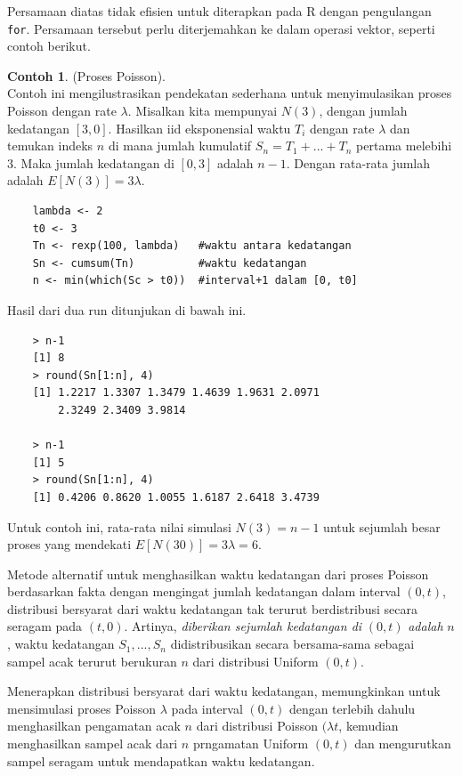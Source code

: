 \documentclass[a4paper,12pt]{article}
\theoremstyle{definition}
\newtheorem{example}{Contoh}[section]
\begin{document}
Persamaan diatas tidak efisien untuk diterapkan pada R dengan pengulangan \texttt{for}. Persamaan tersebut perlu diterjemahkan ke dalam operasi vektor, seperti contoh berikut.

\begin{example} (Proses Poisson). \label{C1}\\
Contoh ini mengilustrasikan pendekatan sederhana untuk menyimulasikan proses Poisson dengan rate $\lambda$. Misalkan kita mempunyai $N(3)$, dengan jumlah kedatangan $[3, 0]$. Hasilkan iid eksponensial waktu $T_i$ dengan rate $\lambda$ dan temukan indeks $n$ di mana jumlah kumulatif $S_n = T_1 + ... + T_n$ pertama melebihi 3. Maka jumlah kedatangan di $[0, 3]$ adalah $n-1$. Dengan rata-rata jumlah adalah $E[N(3)] = 3\lambda$.

    \begin{lstlisting}
    lambda <- 2
    t0 <- 3
    Tn <- rexp(100, lambda)   #waktu antara kedatangan
    Sn <- cumsum(Tn)          #waktu kedatangan
    n <- min(which(Sc > t0))  #interval+1 dalam [0, t0]
    \end{lstlisting}

Hasil dari dua run ditunjukan di bawah ini.

    \begin{lstlisting}
    > n-1
    [1] 8
    > round(Sn[1:n], 4)
    [1] 1.2217 1.3307 1.3479 1.4639 1.9631 2.0971
        2.3249 2.3409 3.9814
        
    > n-1
    [1] 5
    > round(Sn[1:n], 4)
    [1] 0.4206 0.8620 1.0055 1.6187 2.6418 3.4739
    \end{lstlisting}

Untuk contoh ini, rata-rata nilai simulasi $N(3) = n - 1$ untuk sejumlah besar proses yang mendekati $E[N(30)] = 3\lambda = 6$.

Metode alternatif untuk menghasilkan waktu kedatangan dari proses Poisson berdasarkan fakta dengan mengingat jumlah kedatangan dalam interval $(0, t)$, distribusi bersyarat dari waktu kedatangan tak terurut berdistribusi secara seragam pada $(t, 0)$. Artinya, \textit{diberikan sejumlah kedatangan di} $(0, t)$ \textit{adalah} $n$, waktu kedatangan $S_1, ..., S_n$ didistribusikan secara bersama-sama sebagai sampel acak terurut berukuran $n$ dari distribusi Uniform $(0, t)$.

Menerapkan distribusi bersyarat dari waktu kedatangan, memungkinkan untuk mensimulasi proses Poisson $\lambda$ pada interval $(0, t)$ dengan terlebih dahulu menghasilkan pengamatan acak $n$ dari distribusi Poisson $(\lambda t$, kemudian menghasilkan sampel acak dari $n$ prngamatan Uniform $(0, t)$ dan mengurutkan sampel seragam untuk mendapatkan waktu kedatangan.
\end{example}
\end{document}
